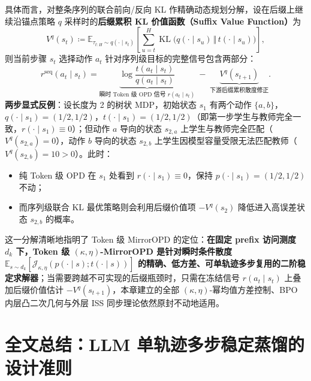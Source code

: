 \documentclass[lang=cn,scheme=chinese,openany]{../book/elegantbook}
\newcommand{\E}{\mathbb E}
\newcommand{\KL}{\operatorname{KL}}
\begin{document}
具体而言，对整条序列的联合前向/反向 KL 作精确动态规划分解，设在后缀上继续沿锚点策略 $q$ 采样时的\textbf{后缀累积 KL 价值函数（Suffix Value Function）}为
\begin{equation}
 V^q(s_t) \coloneqq \E_{\tau_{t:H}\sim q(\cdot\mid s_t)}\left[\sum_{u=t}^{H}\KL\bigl(q(\cdot\mid s_u)\,\big\Vert\,t(\cdot\mid s_u)\bigr)\right],
 \label{eq:suffix-value-function}
\end{equation}
则当前步骤 $s_t$ 选择动作 $a_t$ 针对序列级目标的完整信号包含两部分：
\begin{equation}
 r^{\mathrm{seq}}(a_t\mid s_t)
 = \underbrace{\log\frac{t(a_t\mid s_t)}{q(a_t\mid s_t)}}_{\text{瞬时 Token 级 OPD 信号 } r(a_t\mid s_t)}
 \;-\;
 \underbrace{V^q(s_{t+1})}_{\text{下游后缀累积散度修正}}.
 \label{eq:seq-vs-token-signal}
\end{equation}
\textbf{两步显式反例}：设长度为 2 的树状 MDP，初始状态 $s_1$ 有两个动作 $\{a,b\}$，$q(\cdot\mid s_1)=(1/2,1/2)$，$t(\cdot\mid s_1)=(1/2,1/2)$（即第一步学生与教师完全一致，$r(\cdot\mid s_1)\equiv 0$）；但动作 $a$ 导向的状态 $s_{2,a}$ 上学生与教师完全匹配（$V^q(s_{2,a})=0$），动作 $b$ 导向的状态 $s_{2,b}$ 上学生因模型容量受限无法匹配教师（$V^q(s_{2,b})=10>0$）。此时：
\begin{itemize}
 \item 纯 Token 级 OPD 在 $s_1$ 处看到 $r(\cdot\mid s_1)\equiv 0$，保持 $p(\cdot\mid s_1)=(1/2,1/2)$ 不动；
 \item 而序列级联合 KL 最优策略则会利用后缀价值项 $-V^q(s_2)$ 降低进入高误差状态 $s_{2,b}$ 的概率。
\end{itemize}
这一分解清晰地指明了 Token 级 MirrorOPD 的定位：\textbf{在固定 prefix 访问测度 $d_k$ 下，Token 级 $(\kappa,\eta)$-MirrorOPD 是针对瞬时条件散度 $\E_{s\sim d_k}[\mathcal J_{\kappa,\eta}(p(\cdot\mid s);t(\cdot\mid s))]$ 的精确、低方差、可单轨迹多步复用的二阶稳定求解器}；当需要跨越不可实现的后缀瓶颈时，只需在冻结信号 $r(a_t\mid s_t)$ 上叠加后缀价值估计 $-V^q(s_{t+1})$，本章建立的全部 $(\kappa,\eta)$-幂均值方差控制、BPO 内层凸二次几何与外层 ISS 同步理论依然原封不动地适用。

\section*{全文总结：LLM 单轨迹多步稳定蒸馏的设计准则}
\end{document}
